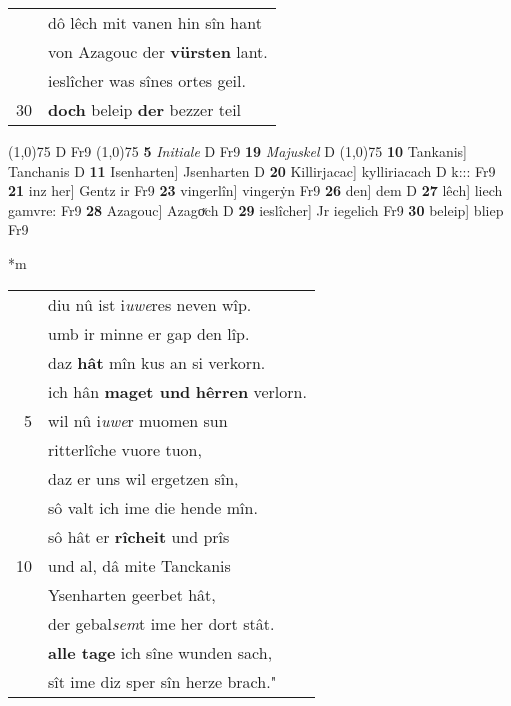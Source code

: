 \documentclass[8pt,a4paper,notitlepage]{article}
\begin{document}
\begin{table}[ht]
\begin{minipage}[t]{0.5\linewidth}
\begin{tabular}{rl}
 & dô lêch mit vanen hin sîn hant\\ 
 & von Azagouc der \textbf{vürsten} lant.\\ 
 & ieslîcher was sînes ortes geil.\\ 
30 & \textbf{doch} beleip \textbf{der} bezzer teil\\ 
\end{tabular}
\scriptsize
\line(1,0){75} \newline
D Fr9 \newline
\line(1,0){75} \newline
\textbf{5} \textit{Initiale} D Fr9  \textbf{19} \textit{Majuskel} D  \newline
\line(1,0){75} \newline
\textbf{10} Tankanis] Tanchanis D \textbf{11} Isenharten] Jsenharten D \textbf{20} Killirjacac] kylliriacach D k::: Fr9 \textbf{21} inz her] Gentz ir Fr9 \textbf{23} vingerlîn] vingerẏn Fr9 \textbf{26} den] dem D \textbf{27} lêch] liech gamvre: Fr9 \textbf{28} Azagouc] Azagoͮch D \textbf{29} ieslîcher] Jr iegelich Fr9 \textbf{30} beleip] bliep Fr9 \newline
\end{minipage}
\hspace{0.5cm}
\begin{minipage}[t]{0.5\linewidth}
\small
\begin{center}*m
\end{center}
\begin{tabular}{rl}
 & diu nû ist i\textit{uwe}res neven wîp.\\ 
 & umb ir minne er gap den lîp.\\ 
 & daz \textbf{hât} mîn kus an si verkorn.\\ 
 & ich hân \textbf{maget und} \textbf{hêrren} verlorn.\\ 
5 & wil nû i\textit{uwe}r muomen sun\\ 
 & ritterlîche vuore tuon,\\ 
 & daz er uns wil ergetzen sîn,\\ 
 & sô valt ich ime die hende mîn.\\ 
 & sô hât er \textbf{rîcheit} und prîs\\ 
10 & und al, dâ mite Tanckanis\\ 
 & Ysenharten geerbet hât,\\ 
 & der gebal\textit{sem}t ime her dort stât.\\ 
 & \textbf{alle tage} ich sîne wunden sach,\\ 
 & sît ime diz sper sîn herze brach."\\ 

\end{tabular}
\end{minipage}
\end{table}
\end{document}
